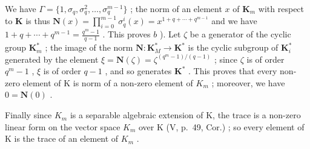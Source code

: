 We have \(\Gamma = \{1, \sigma_q, \sigma_q^2, \ldots, \sigma_q^{m-1}\}\) ; the norm of an element \(x\) of \(\mathbf{K}_m\) with respect to \(\mathbf{K}\) is thus \(\mathbf{N}(x) = \prod_{i=0}^{m-1} \sigma_q^i(x) = x^{1+q+\cdots+q^{m-1}}\) and we have \(1 + q + \cdots + q^{m-1} = \frac{q^m - 1}{q - 1}\) . This proves \(b\) ). Let \(\zeta\) be a generator of the cyclic group \(\mathbf{K}_m^*\) ; the image of the norm \(\mathbf{N}: \mathbf{K}_M^* \to \mathbf{K}^*\) is the cyclic subgroup of \(\mathbf{K}_i^*\) generated by the element \(\xi = \mathbf{N}(\zeta) = \zeta^{(q^m - 1)/(q - 1)}\) ; since \(\zeta\) is of order \(q^m - 1\) , \(\xi\) is of order \(q - 1\) , and so generates \(\mathbf{K}^*\) . This proves that every non-zero element of K is norm of a non-zero element of \(K_{m}\) ; moreover, we have \(0 = \mathbf{N}(0)\) .

Finally since \(K_{m}\) is a separable algebraic extension of K, the trace is a non-zero linear form on the vector space \(K_{m}\) over K (V, p.~49, Cor.) ; so every element of K is the trace of an element of \(K_{m}\) .
